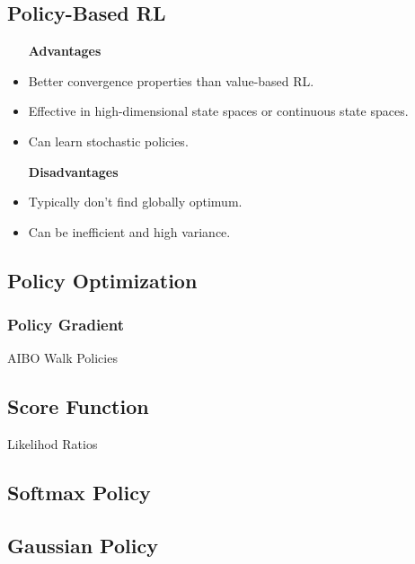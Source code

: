 \subsection{Policy-Based RL}\label{subsec:policy-based-rl}
\begin{itemize}
    \item [\textbf{Advantages}]
    \item Better convergence properties than value-based RL.
    \item Effective in high-dimensional state spaces or continuous state spaces.
    \item Can learn stochastic policies.
    \item [\textbf{Disadvantages}]
    \item Typically don't find globally optimum.
    \item Can be inefficient and high variance.
\end{itemize}

\subsection{Policy Optimization}\label{subsec:policy-optimization}

\subsubsection{Policy Gradient}\label{subsubsec:policy-gradient}


AIBO Walk Policies

\subsection{Score Function}\label{subsec:score-function}
Likelihod Ratios

\subsection{Softmax Policy}\label{subsec:softmax-policy}

\subsection{Gaussian Policy}\label{subsec:gaussian-policy}

